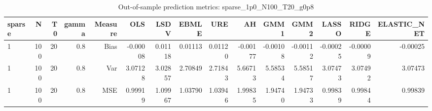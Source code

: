 \begin{table}[!htbp]\centering
\caption{Out-of-sample prediction metrics: sparse_1p0_N100_T20_g0p8}
\label{tab:table3_sparse_1p0_N100_T20_g0p8}
\begin{tabular}{lrrrrrrrrrrrrrr}
\hline
sparse & N & T0 & gamma & Measure & OLS & LSDV & EBMLE & URE & AH & GMM1 & GMM2 & LASSO & RIDGE & ELASTIC_NET \\
\hline
1 & 100 & 20 & 0.8 & Bias & -0.00008 & 0.01118 & 0.01113 & 0.01120 & -0.00177 & -0.00108 & -0.00112 & -0.00025 & -0.00009 & -0.00025 \\
1 & 100 & 20 & 0.8 & Var & 3.07128 & 3.02857 & 2.70849 & 2.71843 & 5.66713 & 5.58534 & 5.58517 & 3.07473 & 3.07492 & 3.07473 \\
1 & 100 & 20 & 0.8 & MSE & 0.99919 & 1.09967 & 1.03790 & 1.03946 & 1.99835 & 1.94740 & 1.94733 & 0.99839 & 0.99844 & 0.99839 \\
\hline
\end{tabular}
\end{table}


